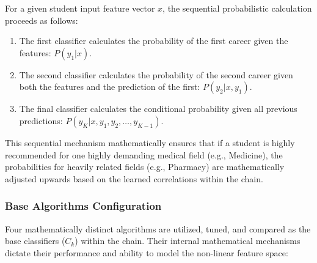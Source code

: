 For a given student input feature vector $x$, the sequential probabilistic calculation proceeds as follows:
\begin{enumerate}
    \item The first classifier calculates the probability of the first career given the features: $P(y_1 | x)$.
    \item The second classifier calculates the probability of the second career given both the features and the prediction of the first: $P(y_2 | x, y_1)$.
    \item The final classifier calculates the conditional probability given all previous predictions: $P(y_K | x, y_1, y_2, \dots, y_{K-1})$.
\end{enumerate}
This sequential mechanism mathematically ensures that if a student is highly recommended for one highly demanding medical field (e.g., Medicine), the probabilities for heavily related fields (e.g., Pharmacy) are mathematically adjusted upwards based on the learned correlations within the chain.

\subsubsection{Base Algorithms Configuration}
Four mathematically distinct algorithms are utilized, tuned, and compared as the base classifiers ($C_k$) within the chain. Their internal mathematical mechanisms dictate their performance and ability to model the non-linear feature space:

